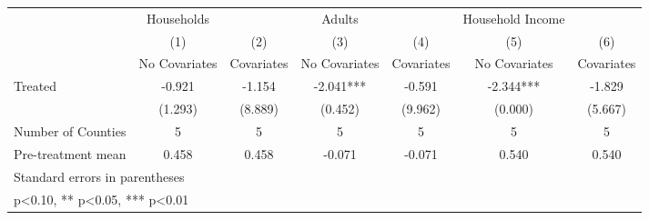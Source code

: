 {
\def\sym#1{\ifmmode^{#1}\else\(^{#1}\)\fi}
\begin{tabular}{l*{6}{c}}
\hline\hline
            &  Households   &               &      Adults   &               &Household Income   &               \\
            &\multicolumn{1}{c}{(1)}&\multicolumn{1}{c}{(2)}&\multicolumn{1}{c}{(3)}&\multicolumn{1}{c}{(4)}&\multicolumn{1}{c}{(5)}&\multicolumn{1}{c}{(6)}\\
            &\multicolumn{1}{c}{No Covariates}&\multicolumn{1}{c}{Covariates}&\multicolumn{1}{c}{No Covariates}&\multicolumn{1}{c}{Covariates}&\multicolumn{1}{c}{No Covariates}&\multicolumn{1}{c}{Covariates}\\
\hline
Treated     &      -0.921   &      -1.154   &      -2.041***&      -0.591   &      -2.344***&      -1.829   \\
            &     (1.293)   &     (8.889)   &     (0.452)   &     (9.962)   &     (0.000)   &     (5.667)   \\
\hline
Number of Counties&           5   &           5   &           5   &           5   &           5   &           5   \\
Pre-treatment mean&       0.458   &       0.458   &      -0.071   &      -0.071   &       0.540   &       0.540   \\
\hline\hline
\multicolumn{7}{l}{\footnotesize Standard errors in parentheses}\\
\multicolumn{7}{l}{\footnotesize * p<0.10, ** p<0.05, *** p<0.01}\\
\end{tabular}
}
